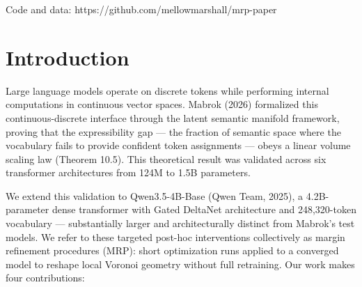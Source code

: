 \documentclass[
  11pt,
]{article}
\begin{document}
Code and data: https://github.com/mellowmarshall/mrp-paper

\hypertarget{introduction}{%
\section{Introduction}\label{introduction}}

Large language models operate on discrete tokens while performing
internal computations in continuous vector spaces. Mabrok (2026)
formalized this continuous-discrete interface through the latent
semantic manifold framework, proving that the expressibility gap --- the
fraction of semantic space where the vocabulary fails to provide
confident token assignments --- obeys a linear volume scaling law
(Theorem 10.5). This theoretical result was validated across six
transformer architectures from 124M to 1.5B parameters.

We extend this validation to Qwen3.5-4B-Base (Qwen Team, 2025), a
4.2B-parameter dense transformer with Gated DeltaNet architecture and
248,320-token vocabulary --- substantially larger and architecturally
distinct from Mabrok's test models. We refer to these targeted post-hoc
interventions collectively as margin refinement procedures (MRP): short
optimization runs applied to a converged model to reshape local Voronoi
geometry without full retraining. Our work makes four contributions:
\end{document}
